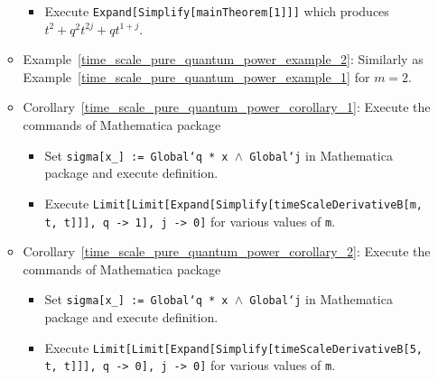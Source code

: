 \begin{itemize}
\begin{itemize}
\begin{itemize}
            \item Execute \texttt{Expand[Simplify[mainTheorem[1]]]} which produces $t^2 + q^2 t^{2 j} + q t^{1 + j}$.
        \end{itemize}
        \item Example~\ref{time_scale_pure_quantum_power_example_2}: Similarly
        as Example~\ref{time_scale_pure_quantum_power_example_1} for $m=2$.
        \item Corollary~\ref{time_scale_pure_quantum_power_corollary_1}:
        Execute the commands of Mathematica package
        \begin{itemize}
            \item Set \texttt{sigma[x\_] := Global`q * x $\wedge$ Global`j} in Mathematica package and execute definition.
            \item Execute \texttt{Limit[Limit[Expand[Simplify[timeScaleDerivativeB[m, t, t]]], q -> 1],
                j -> 0]} for various values of \texttt{m}.
        \end{itemize}
        \item Corollary~\ref{time_scale_pure_quantum_power_corollary_2}:
        Execute the commands of Mathematica package
        \begin{itemize}
            \item Set \texttt{sigma[x\_] := Global`q * x $\wedge$ Global`j} in Mathematica package and execute definition.
            \item Execute \texttt{Limit[Limit[Expand[Simplify[timeScaleDerivativeB[5, t, t]]], q -> 0],
                j -> 0]} for various values of \texttt{m}.
        \end{itemize}
    \end{itemize}
\end{itemize}

